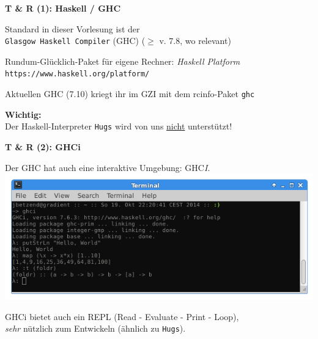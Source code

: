 \documentclass[unknownkeysallowed]{beamer}
\begin{document}
  
  \begin{frame}
    \Large\textbf{T \& R (1): Haskell / GHC}\bigskip \normalsize
    
    Standard in dieser Vorlesung ist der  \\ \texttt{Glasgow Haskell Compiler} (GHC)
    ($\geqslant$ v. 7.8, wo relevant) \pause \bigskip
    
    Rundum-Glücklich-Paket für eigene Rechner: \emph{Haskell Platform}\\
    \texttt{https://www.haskell.org/platform/} \pause \bigskip
    
    Aktuellen GHC (7.10) kriegt ihr im GZI mit dem rcinfo-Paket \texttt{ghc} \pause \smallskip
    
    \begin{important}
    \textbf{Wichtig:}\\Der Haskell-Interpreter \texttt{Hugs} wird von uns \underline{nicht} unterstützt!
    \end{important}
  \end{frame}
  
  
  \begin{frame}
    \Large\textbf{T \& R (2): GHCi}\bigskip \normalsize
    
    Der GHC hat auch eine interaktive Umgebung: GHC\emph{I}.\\\bigskip
    \includegraphics[scale=0.4]{ghci_example.png} 
    
    \bigskip GHCi bietet auch ein REPL (Read - Evaluate - Print - Loop),\\\emph{sehr} nützlich zum Entwickeln (ähnlich zu \texttt{Hugs}).
  \end{frame}
  
\end{document}
